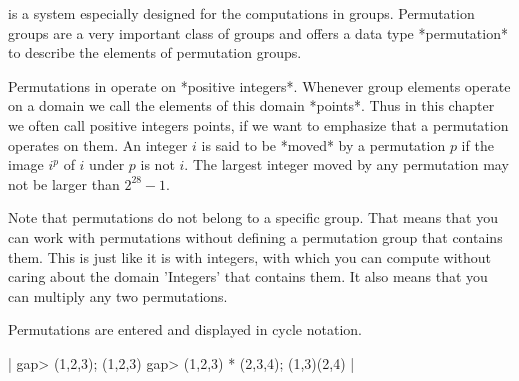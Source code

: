 
{\GAP} is a system  especially  designed for the computations  in groups.
Permutation groups are a very important class of groups and {\GAP} offers
a data type *permutation* to describe the elements of permutation groups.

Permutations  in  {\GAP}  operate on *positive integers*.  Whenever group
elements  operate  on  a domain  we  call  the elements  of  this  domain
*points*.  Thus in this chapter we often  call  positive integers points,
if we want to  emphasize that a permutation operates on them.  An integer
$i$ is said to  be *moved* by a permutation $p$ if the image $i^p$ of $i$
under $p$ is not  $i$.  The largest  integer moved by any permutation may
not be larger  than  $2^{28}-1$.

Note that permutations  do  not belong to  a specific group.   That means
that you can work  with permutations without defining a permutation group
that contains them.  This is  just like  it is  with integers, with which
you can compute without caring about the domain 'Integers' that  contains
them.  It also means that you can multiply any two permutations.

Permutations are entered and displayed in cycle notation.

|    gap> (1,2,3);
    (1,2,3)
    gap> (1,2,3) * (2,3,4);
    (1,3)(2,4) |

